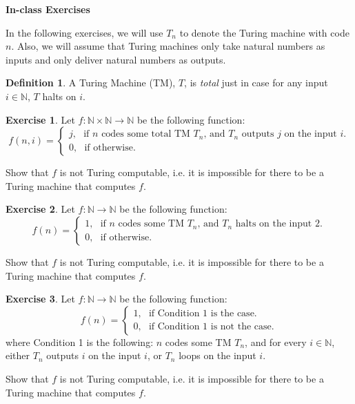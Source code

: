 \documentclass[11pt]{article}
\theoremstyle{definition}
\newtheorem{defn}{Definition}
\newtheorem{exer}{Exercise}
\begin{document}




\begin{center}
{\LARGE \bf In-class Exercises}
\end{center}

\smallskip


In the following exercises, we will use $T_n$ to denote the Turing machine with code $n$. Also, we will assume that Turing machines only take natural numbers as inputs and only deliver natural numbers as outputs.

\begin{defn}
A Turing Machine (TM), $T$, is \textit{total} just in case for any input $i \in \mathbb{N}$, $T$ halts on $i$. 
\end{defn}

\begin{exer}
Let $f: \mathbb{N} \times \mathbb{N} \rightarrow \mathbb{N}$ be the following function:
$$
f(n, i) = 
\begin{cases}
j, \, \, \, \, \text{if $n$ codes some total TM $T_n$, and $T_n$ outputs $j$ on the input $i$.} \\
0, \, \, \, \, \text{if otherwise.}
\end{cases}
$$

Show that $f$ is not Turing computable, i.e. it is impossible for there to be a Turing machine that computes $f$.
\end{exer}

\begin{exer}
Let $f: \mathbb{N} \rightarrow \mathbb{N}$ be the following function:
$$
f(n) = 
\begin{cases}
1, \, \, \, \, \text{if $n$ codes some TM $T_n$, and $T_n$ halts on the input $2$.} \\
0, \, \, \, \, \text{if otherwise.}
\end{cases}
$$

Show that $f$ is not Turing computable, i.e. it is impossible for there to be a Turing machine that computes $f$. 
\end{exer}

\begin{exer}
Let $f: \mathbb{N} \rightarrow \mathbb{N}$ be the following function:
$$
f(n) = 
\begin{cases}
1, \, \, \, \, \text{if Condition 1 is the case.} \\
0, \, \, \, \, \text{if Condition 1 is not the case.}
\end{cases}
$$
where Condition 1 is the following: $n$ codes some TM $T_n$, and for every $i \in \mathbb{N}$, either $T_n$ outputs $i$ on the input $i$, or $T_n$ loops on the input $i$.

Show that $f$ is not Turing computable, i.e. it is impossible for there to be a Turing machine that computes $f$. 
\end{exer}
\end{document}
